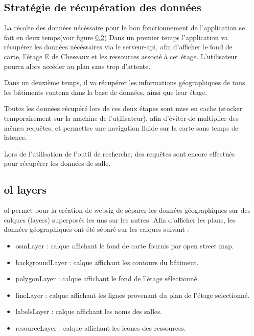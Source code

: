 \documentclass[
    iai, %
    il, %
]{heig-tb}
\begin{document}
\subsection{Stratégie de récupération des données}

La récolte des données nécéssaire pour le bon fonctionnement de l'application se fait en deux temps(voir figure \ref{})
Dans un premier temps l'application va récupérer les données nécéssaires via le serveur-api,
afin d'afficher le fond de carte, l'étage E de Cheseaux et les ressources associé à cet étage.
L'utilisateur pourra alors accéder au plan sans trop d'attente.

Dans un deuxième temps, il va récupérer les informations géographiques de tous les bâtiments contenu dans la base de données,
ainsi que leur étage.

Toutes les données récupéré lors de ces deux étapes sont mise en cache (stocker temporairement sur la machine de l'utilisateur),
afin d'éviter de multiplier des mêmes requêtes, et permettre une navigation fluide sur la carte sans temps de latence.

Lors de l'utilisation de l'outil de recherche, des requêtes sont encore effectués pour récupérer les données de salle.

\subsection{\gls{ol} layers}
\gls{ol} permet pour la création de \gls{websig} de séparer les données géographiques sur des calques (layers) superposés les uns sur les autres.
Afin d'afficher les plans, les données géographiques ont été séparé sur les calques suivant : 

\begin{itemize}
    \item osmLayer : calque affichant le fond de carte fournis par open street map.
    \item backgroundLayer : calque affichant les contours du bâtiment.
    \item polygonLayer : calque affichant le fond de l'étage sélectionné.
    \item lineLayer : calque affichant les lignes provenant du plan de l'étage selectionné.
    \item labelsLayer : calque affichant les noms des salles.
    \item resourceLayer : calque affichant les icones des ressources.
\end{itemize}
\end{document}
